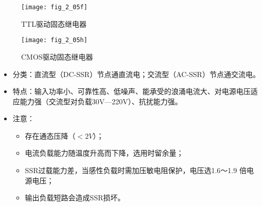 \begin{enumerate}
\begin{figure}[h]
  \centering
  \texttt{[image: fig\_2\_05f]}
  \caption{TTL驱动固态继电器}\label{fig_2_05f}
\end{figure}


\begin{figure}[h]
  \centering
  \texttt{[image: fig\_2\_05h]}
  \caption{CMOS驱动固态继电器}\label{fig_2_05h}
\end{figure}

\begin{itemize}

  \item 分类：直流型（DC-SSR）节点通直流电；交流型（AC-SSR）节点通交流电。

  \item 特点：输入功率小、可靠性高、低噪声、能承受的浪涌电流大、对电源电压适应能力强（交流型对负载30V—220V）、抗扰能力强。


  \item 注意：
  \begin{itemize}
    \item 存在通态压降（$<2V$）；

    \item 电流负载能力随温度升高而下降，选用时留余量；

    \item SSR过载能力差，当感性负载时需加压敏电阻保护，电压选1.6～1.9 倍电源电压；
\item 输出负载短路会造成SSR损坏。

  \end{itemize}
\end{itemize}



\end{enumerate}


